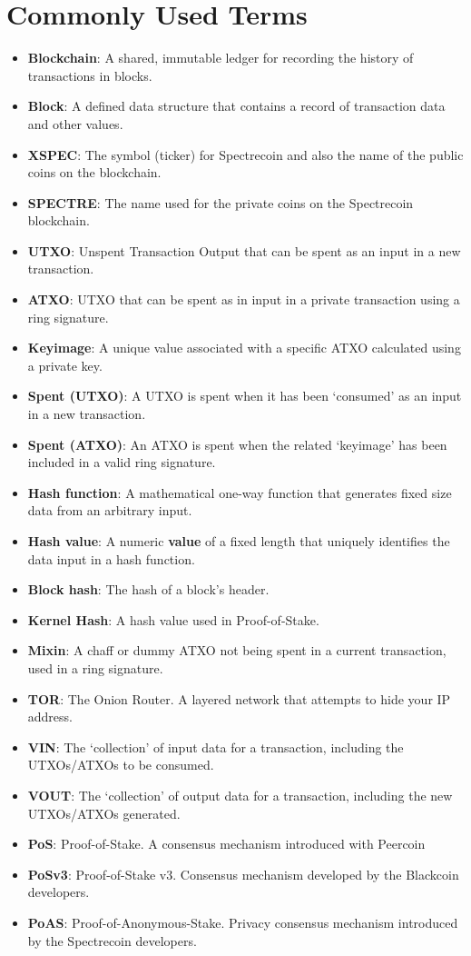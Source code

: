 \chapter{Commonly Used Terms}
\begin{itemize}
	\item \textbf{Blockchain}: A shared, immutable ledger for recording the history of transactions in blocks.
	\item \textbf{Block}: A defined data structure that contains a record of transaction data and other values.
	\item \textbf{XSPEC}: The symbol (ticker) for Spectrecoin and also the name of the public coins on the blockchain.
	\item \textbf{SPECTRE}: The name used for the private coins on the Spectrecoin blockchain.
	\item \textbf{UTXO}: Unspent Transaction Output that can be spent as an input in a new transaction.
	\item \textbf{ATXO}: UTXO that can be spent as in input in a private transaction using a ring signature.
	\item \textbf{Keyimage}: A unique value associated with a specific ATXO calculated using a private key.
	\item \textbf{Spent (UTXO)}: A UTXO is spent when it has been ‘consumed’ as an input in a new transaction.
	\item \textbf{Spent (ATXO)}: An ATXO is spent when the related ‘keyimage’ has been included in a valid ring signature.
	\item \textbf{Hash function}: A mathematical one-way function that generates fixed size data from an arbitrary input.
	\item \textbf{Hash value}: A numeric \textbf{value} of a fixed length that uniquely identifies the data input in a hash function.
	\item \textbf{Block hash}: The hash of a block's header.
	\item \textbf{Kernel Hash}: A hash value used in Proof-of-Stake.
	\item \textbf{Mixin}: A chaff or dummy ATXO not being spent in a current transaction, used in a ring signature.
	\item \textbf{TOR}: The Onion Router. A layered network that attempts to hide your IP address.
	\item \textbf{VIN}: The ‘collection’ of input data for a transaction, including the UTXOs/ATXOs to be consumed.
	\item \textbf{VOUT}: The ‘collection’ of output data for a transaction, including the new UTXOs/ATXOs generated.
	\item \textbf{PoS}: Proof-of-Stake. A consensus mechanism introduced with Peercoin
	\item \textbf{PoSv3}: Proof-of-Stake v3. Consensus mechanism developed by the Blackcoin developers.
	\item \textbf{PoAS}: Proof-of-Anonymous-Stake. Privacy consensus mechanism introduced by the Spectrecoin developers.
\end{itemize}



